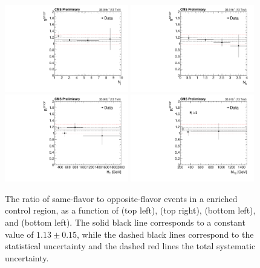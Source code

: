 \begin{figure}
	\centering
	\includegraphics[width=0.48\textwidth]{backgrounds/figs/RSFOF_nj}
	\includegraphics[width=0.48\textwidth]{backgrounds/figs/RSFOF_nb}
	\includegraphics[width=0.48\textwidth]{backgrounds/figs/RSFOF_ht}
	\includegraphics[width=0.48\textwidth]{backgrounds/figs/RSFOF_mt2}
	\renewcommand{\baselinestretch}{1.0}
	\caption[The ratio of same-flavor to opposite-flavor events in a \ttbar enriched control region, as a function of \nj (top left), \nb (top right), \HT (bottom left), and \mttwo (bottom left).]{The ratio of same-flavor to opposite-flavor events in a \ttbar enriched control region, as a function of \nj (top left), \nb (top right), \HT (bottom left), and \mttwo (bottom left). The solid black line corresponds to a constant value of $1.13 \pm 0.15$, while the dashed black lines correspond to the statistical uncertainty and the dashed red lines the total systematic uncertainty.}
	\label{fig:rsfof}
\end{figure}
